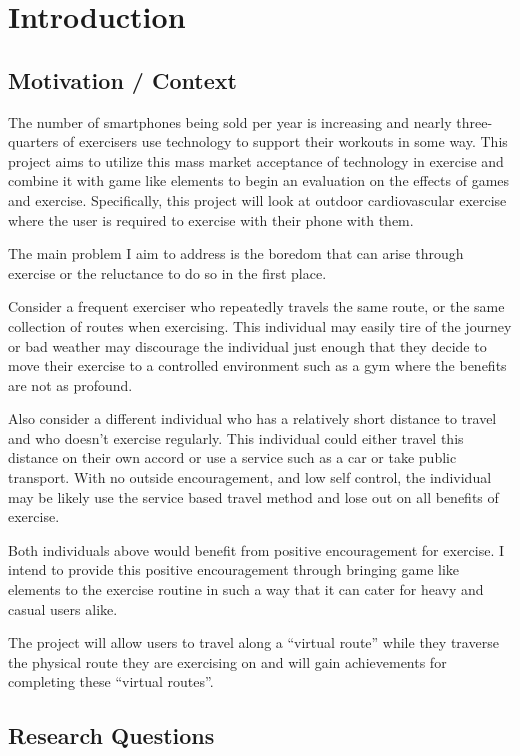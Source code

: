\chapter{Introduction}\label{ch_intro}
\section{Motivation / Context}
The number of smartphones being sold per year is
increasing\cite{phones_gartner, phones_guardian} and nearly
three-quarters of exercisers use technology to support their
workouts in some way\cite{lifefitness}. This project aims to utilize this mass market
acceptance of technology in exercise and combine it with game like
elements to begin an evaluation on the effects of games and
exercise. Specifically, this project will look at outdoor
cardiovascular exercise where the user is required to exercise with
their phone with them.

The main problem I aim to address is the boredom that can arise
through exercise or the reluctance to do so in the first
place. 

Consider a frequent exerciser who repeatedly travels the same route,
or the same collection of routes when exercising. This individual may
easily tire of the journey or bad weather may discourage the
individual just enough that they decide to move their exercise to a
controlled environment such as a gym where the benefits are not as profound.

Also consider a different individual who has a relatively short distance to
travel and who doesn't exercise regularly. This individual could
either travel this distance on their own accord or use a service such
as a car or take public transport. With no outside encouragement, and
low self control, the individual may be likely use the service based
travel method and lose out on all benefits of exercise.

Both individuals above would benefit from positive encouragement for
exercise. I intend to provide this positive encouragement through
bringing game like elements to the exercise routine in such a way that
it can cater for heavy and casual users alike.

The project will allow users to travel along a ``virtual route''
while they traverse the physical route they are exercising on and will
gain achievements for completing these ``virtual routes''.

\section{Research Questions}

